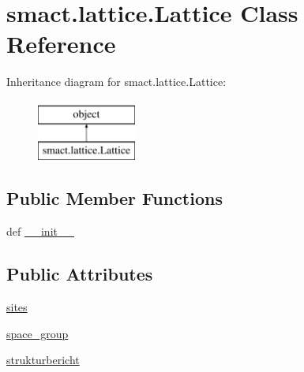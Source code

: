 \hypertarget{classsmact_1_1lattice_1_1_lattice}{}\section{smact.\+lattice.\+Lattice Class Reference}
\label{classsmact_1_1lattice_1_1_lattice}
Inheritance diagram for smact.\+lattice.\+Lattice\+:\begin{figure}[H]
\begin{center}
\leavevmode
\includegraphics[height=2.000000cm]{classsmact_1_1lattice_1_1_lattice}
\end{center}
\end{figure}
\subsection*{Public Member Functions}
\begin{DoxyCompactItemize}
\item 
def \hyperlink{classsmact_1_1lattice_1_1_lattice_ae825975e73ce79c8f887136a3312539f}{\+\_\+\+\_\+init\+\_\+\+\_\+}
\end{DoxyCompactItemize}
\subsection*{Public Attributes}
\begin{DoxyCompactItemize}
\item 
\hyperlink{classsmact_1_1lattice_1_1_lattice_aebb6987b958080b9cb3a5522733371ea}{sites}
\item 
\hyperlink{classsmact_1_1lattice_1_1_lattice_adc28d116ff0ff923afbd89bd71ca1f3b}{space\+\_\+group}
\item 
\hyperlink{classsmact_1_1lattice_1_1_lattice_a74402107431fd73d860a299bb4a750ce}{strukturbericht}
\end{DoxyCompactItemize}


